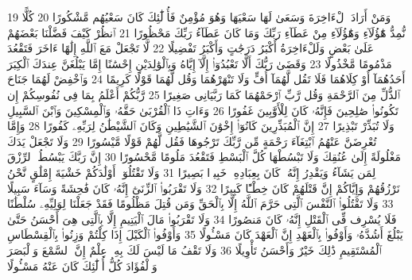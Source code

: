 {\tiny\colorbox{cl_aya}{19}} وَمَنْ أَرَادَ ٱلْءَاخِرَةَ وَسَعَىٰ لَهَا سَعْيَهَا وَهُوَ مُؤْمِنٌ فَأُو۟لَٰٓئِكَ كَانَ سَعْيُهُم مَّشْكُورًا
{\tiny\colorbox{cl_aya}{20}} كُلًّا نُّمِدُّ هَٰٓؤُلَآءِ وَهَٰٓؤُلَآءِ مِنْ عَطَآءِ رَبِّكَ وَمَا كَانَ عَطَآءُ رَبِّكَ مَحْظُورًا
{\tiny\colorbox{cl_aya}{21}} ٱنظُرْ كَيْفَ فَضَّلْنَا بَعْضَهُمْ عَلَىٰ بَعْضٍ وَلَلْءَاخِرَةُ أَكْبَرُ دَرَجَٰتٍ وَأَكْبَرُ تَفْضِيلًا
{\tiny\colorbox{cl_aya}{22}} لَّا تَجْعَلْ مَعَ ٱللَّهِ إِلَٰهًا ءَاخَرَ فَتَقْعُدَ مَذْمُومًا مَّخْذُولًا
{\tiny\colorbox{cl_aya}{23}} وَقَضَىٰ رَبُّكَ أَلَّا تَعْبُدُوٓا۟ إِلَّآ إِيَّاهُ وَبِٱلْوَٰلِدَيْنِ إِحْسَٰنًا إِمَّا يَبْلُغَنَّ عِندَكَ ٱلْكِبَرَ أَحَدُهُمَآ أَوْ كِلَاهُمَا فَلَا تَقُل لَّهُمَآ أُفٍّ وَلَا تَنْهَرْهُمَا وَقُل لَّهُمَا قَوْلًا كَرِيمًا
{\tiny\colorbox{cl_aya}{24}} وَٱخْفِضْ لَهُمَا جَنَاحَ ٱلذُّلِّ مِنَ ٱلرَّحْمَةِ وَقُل رَّبِّ ٱرْحَمْهُمَا كَمَا رَبَّيَانِى صَغِيرًا
{\tiny\colorbox{cl_aya}{25}} رَّبُّكُمْ أَعْلَمُ بِمَا فِى نُفُوسِكُمْ إِن تَكُونُوا۟ صَٰلِحِينَ فَإِنَّهُۥ كَانَ لِلْأَوَّٰبِينَ غَفُورًا
{\tiny\colorbox{cl_aya}{26}} وَءَاتِ ذَا ٱلْقُرْبَىٰ حَقَّهُۥ وَٱلْمِسْكِينَ وَٱبْنَ ٱلسَّبِيلِ وَلَا تُبَذِّرْ تَبْذِيرًا
{\tiny\colorbox{cl_aya}{27}} إِنَّ ٱلْمُبَذِّرِينَ كَانُوٓا۟ إِخْوَٰنَ ٱلشَّيَٰطِينِ وَكَانَ ٱلشَّيْطَٰنُ لِرَبِّهِۦ كَفُورًا
{\tiny\colorbox{cl_aya}{28}} وَإِمَّا تُعْرِضَنَّ عَنْهُمُ ٱبْتِغَآءَ رَحْمَةٍ مِّن رَّبِّكَ تَرْجُوهَا فَقُل لَّهُمْ قَوْلًا مَّيْسُورًا
{\tiny\colorbox{cl_aya}{29}} وَلَا تَجْعَلْ يَدَكَ مَغْلُولَةً إِلَىٰ عُنُقِكَ وَلَا تَبْسُطْهَا كُلَّ ٱلْبَسْطِ فَتَقْعُدَ مَلُومًا مَّحْسُورًا
{\tiny\colorbox{cl_aya}{30}} إِنَّ رَبَّكَ يَبْسُطُ ٱلرِّزْقَ لِمَن يَشَآءُ وَيَقْدِرُ إِنَّهُۥ كَانَ بِعِبَادِهِۦ خَبِيرًۢا بَصِيرًا
{\tiny\colorbox{cl_aya}{31}} وَلَا تَقْتُلُوٓا۟ أَوْلَٰدَكُمْ خَشْيَةَ إِمْلَٰقٍ نَّحْنُ نَرْزُقُهُمْ وَإِيَّاكُمْ إِنَّ قَتْلَهُمْ كَانَ خِطْـًٔا كَبِيرًا
{\tiny\colorbox{cl_aya}{32}} وَلَا تَقْرَبُوا۟ ٱلزِّنَىٰٓ إِنَّهُۥ كَانَ فَٰحِشَةً وَسَآءَ سَبِيلًا
{\tiny\colorbox{cl_aya}{33}} وَلَا تَقْتُلُوا۟ ٱلنَّفْسَ ٱلَّتِى حَرَّمَ ٱللَّهُ إِلَّا بِٱلْحَقِّ وَمَن قُتِلَ مَظْلُومًا فَقَدْ جَعَلْنَا لِوَلِيِّهِۦ سُلْطَٰنًا فَلَا يُسْرِف فِّى ٱلْقَتْلِ إِنَّهُۥ كَانَ مَنصُورًا
{\tiny\colorbox{cl_aya}{34}} وَلَا تَقْرَبُوا۟ مَالَ ٱلْيَتِيمِ إِلَّا بِٱلَّتِى هِىَ أَحْسَنُ حَتَّىٰ يَبْلُغَ أَشُدَّهُۥ وَأَوْفُوا۟ بِٱلْعَهْدِ إِنَّ ٱلْعَهْدَ كَانَ مَسْـُٔولًا
{\tiny\colorbox{cl_aya}{35}} وَأَوْفُوا۟ ٱلْكَيْلَ إِذَا كِلْتُمْ وَزِنُوا۟ بِٱلْقِسْطَاسِ ٱلْمُسْتَقِيمِ ذَٰلِكَ خَيْرٌ وَأَحْسَنُ تَأْوِيلًا
{\tiny\colorbox{cl_aya}{36}} وَلَا تَقْفُ مَا لَيْسَ لَكَ بِهِۦ عِلْمٌ إِنَّ ٱلسَّمْعَ وَٱلْبَصَرَ وَٱلْفُؤَادَ كُلُّ أُو۟لَٰٓئِكَ كَانَ عَنْهُ مَسْـُٔولًا
